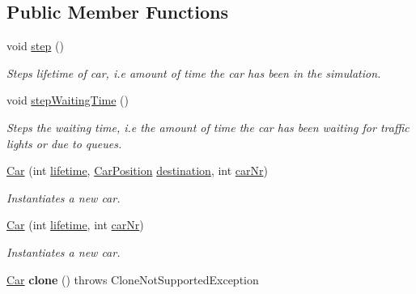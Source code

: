 \subsection*{Public Member Functions}
\begin{DoxyCompactItemize}
\item 
\hypertarget{class_car_abc94983f5c6da76940df4087acaa90c8}{void \hyperlink{class_car_abc94983f5c6da76940df4087acaa90c8}{step} ()}\label{class_car_abc94983f5c6da76940df4087acaa90c8}

\begin{DoxyCompactList}\small\item\em Steps lifetime of car, i.\+e amount of time the car has been in the simulation. \end{DoxyCompactList}\item 
\hypertarget{class_car_a3c0e698c2a1173191ee6fdb24f21e201}{void \hyperlink{class_car_a3c0e698c2a1173191ee6fdb24f21e201}{step\+Waiting\+Time} ()}\label{class_car_a3c0e698c2a1173191ee6fdb24f21e201}

\begin{DoxyCompactList}\small\item\em Steps the waiting time, i.\+e the amount of time the car has been waiting for traffic lights or due to queues. \end{DoxyCompactList}\item 
\hyperlink{class_car_a7dbb44fc230f48c8482f48187da025ca}{Car} (int \hyperlink{class_car_a6c77e5ff6ce04822eca2d7b246d3b516}{lifetime}, \hyperlink{class_car_position}{Car\+Position} \hyperlink{class_car_a8ec85c8488be9a19f14077fb861b7753}{destination}, int \hyperlink{class_car_afde6b5c1b796970c1c57c3039058b731}{car\+Nr})
\begin{DoxyCompactList}\small\item\em Instantiates a new car. \end{DoxyCompactList}\item 
\hyperlink{class_car_af2ee886c2de97f28065affbfe4fe88ef}{Car} (int \hyperlink{class_car_a6c77e5ff6ce04822eca2d7b246d3b516}{lifetime}, int \hyperlink{class_car_afde6b5c1b796970c1c57c3039058b731}{car\+Nr})
\begin{DoxyCompactList}\small\item\em Instantiates a new car. \end{DoxyCompactList}\item 
\hypertarget{class_car_ad3b361d4b20d3d13034f964eb023e213}{\hyperlink{class_car}{Car} {\bfseries clone} ()  throws Clone\+Not\+Supported\+Exception}\label{class_car_ad3b361d4b20d3d13034f964eb023e213}


\end{DoxyCompactItemize}
